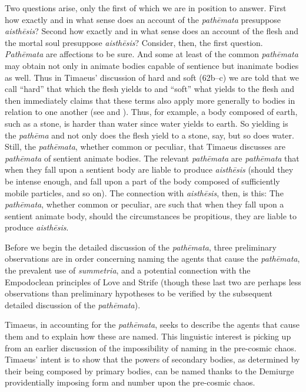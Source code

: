 Two questions arise, only the first of which we are in position to answer. First how exactly and in what sense does an account of the \emph{pathēmata} presuppose \emph{aisthēsis}? Second how exactly and in what sense does an account of the flesh and the mortal soul presuppose \emph{aisthēsis}? Consider, then, the first question. \emph{Pathēmata} are affections to be sure. And some at least of the common \emph{pathēmata} may obtain not only in animate bodies capable of sentience but inanimate bodies as well. Thus in Timaeus' discussion of hard and soft (62b--c) we are told that we call ``hard'' that which the flesh yields to and ``soft'' what yields to the flesh and then immediately claims that these terms also apply more generally to bodies in relation to one another (see \citealt[228, n6]{Archer-Hind:1888qd} and \citealt[110]{OBrien:1984ji}). Thus, for example, a body composed of earth, such as a stone, is harder than water since water yields to earth. So yielding is the \emph{pathēma} and not only does the flesh yield to a stone, say, but so does water. Still, the \emph{pathēmata}, whether common or peculiar, that Timaeus discusses are \emph{pathēmata} of sentient animate bodies. The relevant \emph{pathēmata} are \emph{pathēmata} that when they fall upon a sentient body are liable to produce \emph{aisthēsis} (should they be intense enough, and fall upon a part of the body composed of sufficiently mobile particles, and so on). The connection with \emph{aisthēsis}, then, is this: The \emph{pathēmata}, whether common or peculiar, are such that when they fall upon a sentient animate body, should the circumstances be propitious, they are liable to produce \emph{aisthēsis}.

Before we begin the detailed discussion of the \emph{pathēmata}, three preliminary observations are in order concerning naming the agents that cause the \emph{pathēmata}, the prevalent use of \emph{summetria}, and a potential connection with the Empodoclean principles of Love and Strife (though these last two are perhaps less observations than preliminary hypotheses to be verified by the subsequent detailed discussion of the \emph{pathēmata}).

Timaeus, in accounting for the \emph{pathēmata}, seeks to describe the agents that cause them and to explain how these are named. This linguistic interest is picking up from an earlier discussion of the impossibility of naming in the pre-cosmic chaos. Timaeus' intent is to show that the powers of secondary bodies, as determined by their being composed by primary bodies, can be named thanks to the Demiurge providentially imposing form and number upon the pre-cosmic chaos.

